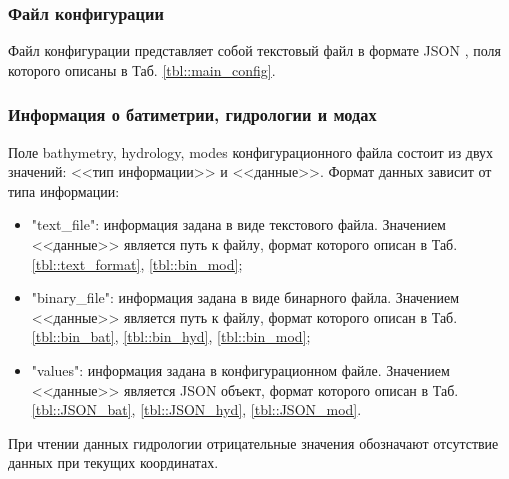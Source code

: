 \documentclass{fefu}
\begin{document}
            \subsubsection{Файл конфигурации}
                \par Файл конфигурации представляет собой текстовый файл в формате JSON \cite{json}, поля которого описаны в Таб. \ref{tbl::main_config}.
            \subsubsection{Информация о батиметрии, гидрологии и модах}
                \par Поле \textsf{bathymetry}, \textsf{hydrology}, \textsf{modes} конфигурационного файла состоит из двух значений: <<тип информации>> и <<данные>>. Формат данных зависит от типа информации:
                \begin{itemize}
                    \item \textsf{"text\_file"}: информация задана в виде текстового файла. Значением <<данные>> является путь к файлу, формат которого описан в Таб. \ref{tbl::text_format}, \ref{tbl::bin_mod};
                    \item \textsf{"binary\_file"}: информация задана в виде бинарного файла. Значением <<данные>> является путь к файлу, формат которого описан в Таб. \ref{tbl::bin_bat}, \ref{tbl::bin_hyd}, \ref{tbl::bin_mod};
                    \item \textsf{"values"}: информация задана в конфигурационном файле. Значением <<данные>> является JSON объект, формат которого описан в Таб. \ref{tbl::JSON_bat}, \ref{tbl::JSON_hyd}, \ref{tbl::JSON_mod}.
                \end{itemize}
                При чтении данных гидрологии отрицательные значения обозначают отсутствие данных при текущих координатах. 
\end{document}
